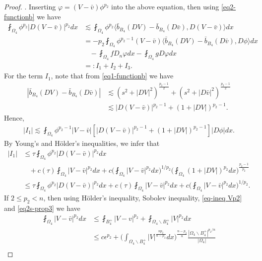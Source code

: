 \documentclass[a4paper,10pt]{amsart}
\newcommand{\lesi}{\lesssim}
\newcommand{\f}{\frac}
\newcommand{\Om}{\Omega}
\begin{document}
\begin{proof}
. 
Inserting $\varphi=(V-\bar{v})\phi^{p_2}$ into the above equation, then using \eqref{eq2-functionb} we have
\begin{equation}\label{eq-V-v}
\begin{aligned}
\fint_{\Om_{4}}\phi^{p_2}|D(V-\bar{v})|^{p_2}dx&\lesi \fint_{\Om_{4}}\phi^{p_2} \langle \bar{b}_{B_4}(DV)-\bar{b}_{B_4}(D{\bar{v}}),D(V-\bar{v})\rangle dx\\
&=-p_2\fint_{\Om_{4}}\phi^{p_2-1}(V-\bar{v})\langle \bar{b}_{B_4}(DV)-\bar{b}_{B_4}(D{\bar{v}}),D\phi\rangle dx\\
&\ \ \ \ -\fint_{\Om_{4}} fD_n\varphi dx-\fint_{\Om_{4}} gD\varphi dx\\
&=:I_1+I_2+I_3.
\end{aligned}
\end{equation}
For the term $I_1$, note that from \eqref{eq1-functionb} we have
$$
\begin{aligned}
|\bar{b}_{B_4}(DV)-\bar{b}_{B_4}(D{\bar{v}})|&\lesi (s^2+|DV|^2)^{\f{p_2-1}{2}}+(s^2+|D{\bar{v}}|^2)^{\f{p_2-1}{2}}\\
&\lesi |D(V-\bar{v})|^{p_2-1}+(1+|D{V}|)^{p_2-1}.
\end{aligned}
$$
Hence,
$$
\begin{aligned}
|I_1|\lesi \fint_{\Om_{4 }}\phi^{p_2-1}|V-\bar{v}|\left[|D(V-\bar{v})|^{p_2-1}+(1+|D{V}|)^{p_2-1}\right]|D\phi|dx.
\end{aligned}
$$
By Young's and H\"older's inequalities, we infer that 
$$
\begin{aligned}
|I_1|&\leq \tau\fint_{\Om_{4}}\phi^{p_2}|D(V-\bar{v})|^{p_2}dx\\
&\ \ \ \ +c(\tau)\fint_{\Om_{4 }}|V-\bar{v}|^{p_2}dx+c\Big(\fint_{\Om_{4 }}|V-\bar{v}|^{p_2}dx\Big)^{1/p_2}\Big(\fint_{\Om_{4 }}(1+|DV|)^{p_2}dx\Big)^{\f{p_2-1}{p_2}}\\
&\leq \tau\fint_{\Om_{4}}\phi^{p_2}|D(V-\bar{v})|^{p_2}dx+c(\tau)\fint_{\Om_{4 }}|V-\bar{v}|^{p_2}dx+c\Big(\fint_{\Om_{4 }}|V-\bar{v}|^{p_2}dx\Big)^{1/p_2}.
\end{aligned}
$$
If $2\leq p_2<n$, then using H\"older's inequality, Sobolev inequality, \eqref{eq-ineq Vp2} and \eqref{eq2s-prop3} we have
\begin{equation}\label{eq p2<n}
\begin{aligned}
\fint_{\Om_{4 }}|V-\bar{v}|^{p_2}dx&\leq \fint_{B_4^+}|V-v|^{p_2}+\fint_{\Om_{4 }\backslash B_4^+}|V|^{p_2}dx\\
&\leq c\epsilon^{p_2}+ \Big( \int_{\Om_{4 }\backslash B_4^+}|V|^{\f{np_2}{n-p_2}}dx\Big)^{\f{n-p_2}{n}}\f{|\Om_{4 }\backslash B_4^+|^{p_2/n}}{|\Om_{4 }|}\\

\end{aligned}
\end{equation}
\end{proof}
\end{document}
